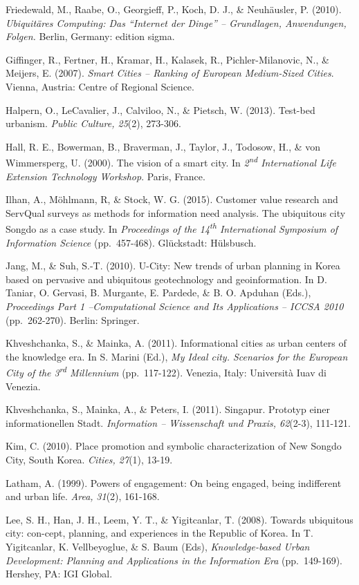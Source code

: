 \documentclass[a4paper,
fontsize=11pt,
oneside,
numbers=noperiodatend,
parskip=half-,
bibliography=totoc,
final
]{scrartcl}
\begin{document}
Friedewald, M., Raabe, O., Georgieff, P., Koch, D. J., \& Neuhäusler, P.
(2010). \emph{Ubiquitäres Computing: Das \enquote{Internet der Dinge} --
Grundlagen, Anwendungen, Folgen.} Berlin, Germany: edition sigma.

Giffinger, R., Fertner, H., Kramar, H., Kalasek, R., Pichler-Milanovic,
N., \& Meijers, E. (2007). \emph{Smart Cities -- Ranking of European
Medium-Sized Cities}. Vienna, Austria: Centre of Regional Science.

Halpern, O., LeCavalier, J., Calviloo, N., \& Pietsch, W. (2013).
Test-bed urbanism. \emph{Public Culture, 25}(2), 273-306.

Hall, R. E., Bowerman, B., Braverman, J., Taylor, J., Todosow, H., \&
von Wimmersperg, U. (2000). The vision of a smart city. In
\emph{2\textsuperscript{nd} International Life Extension Technology
Workshop}. Paris, France.

Ilhan, A., Möhlmann, R, \& Stock, W. G. (2015). Customer value research
and ServQual surveys as methods for information need analysis. The
ubiquitous city Songdo as a case study. In \emph{Proceedings of the
14\textsuperscript{th} International Symposium of Information Science}
(pp.~457-468). Glückstadt: Hülsbusch.

Jang, M., \& Suh, S.-T. (2010). U-City: New trends of urban planning in
Korea based on pervasive and ubiquitous geotechnology and
geoinformation. In D. Taniar, O. Gervasi, B. Murgante, E. Pardede, \& B.
O. Apduhan (Eds.), \emph{Proceedings Part 1 --Computational Science and
Its Applications -- ICCSA 2010} (pp.~262-270). Berlin: Springer.

Khveshchanka, S., \& Mainka, A. (2011). Informational cities as urban
centers of the knowledge era. In S. Marini (Ed.), \emph{My Ideal city.
Scenarios for the European City of the 3\textsuperscript{rd} Millennium}
(pp.~117-122). Venezia, Italy: Università Iuav di Venezia.

Khveshchanka, S., Mainka, A., \& Peters, I. (2011). Singapur. Prototyp
einer informationellen Stadt. \emph{Information -- Wissenschaft und
Praxis, 62}(2-3), 111-121.

Kim, C. (2010). Place promotion and symbolic characterization of New
Songdo City, South Korea. \emph{Cities, 27}(1), 13-19.

Latham, A. (1999). Powers of engagement: On being engaged, being
indifferent and urban life. \emph{Area,} \emph{31}(2), 161-168.

Lee, S. H., Han, J. H., Leem, Y. T., \& Yigitcanlar, T. (2008). Towards
ubiquitous city: con-cept, planning, and experiences in the Republic of
Korea. In T. Yigitcanlar, K. Vellbeyoglue, \& S. Baum (Eds),
\emph{Knowledge-based Urban Development: Planning and Applications in
the Information Era} (pp.~149-169). Hershey, PA: IGI Global.
\end{document}
